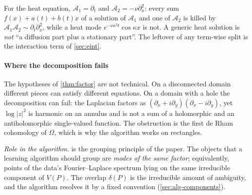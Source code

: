 \documentclass[11pt]{article}
\theoremstyle{plain}
\theoremstyle{definition}
\theoremstyle{remark}
\newcommand{\Var}{V}                        %
\newcommand{\deltaP}{\delta(P)}             %
\newcommand{\abs}[1]{\lvert#1\rvert}
\newcommand{\roleinalg}[1]{\par\noindent\emph{Role in the algorithm.} #1\par}
\begin{document}
For the heat equation, $\mathcal A_1=\partial_t$ and $\mathcal A_2=-\nu\partial_x^2$: every sum $f(x)+a(t)+b(t)x$ of a
solution of $\mathcal A_1$ and one of $\mathcal A_2$ is killed by $\mathcal A_1\mathcal A_2\sim\partial_t\partial_x^2$, while a heat mode
$e^{-\nu\kappa^2t}\cos\kappa x$ is not. A generic heat solution is \emph{not} ``a diffusion part plus a
stationary part''. The leftover of any term-wise split is the interaction term of
\cref{sec:eint}.

\paragraph{Where the decomposition fails}
The hypotheses of \cref{thm:factor} are not technical. On a disconnected domain different pieces
can satisfy different equations. On a domain with a hole the decomposition can fail: the Laplacian
factors as $(\partial_x+i\partial_y)(\partial_x-i\partial_y)$, yet $\log\abs{z}^2$ is harmonic on an annulus
and is not a sum of a holomorphic and an antiholomorphic single-valued function. The obstruction is
the first de Rham cohomology of $\Omega$, which is why the algorithm works on rectangles.

\roleinalg{ is the grouping principle of the paper. The objects that a learning
algorithm should group are \emph{modes of the same factor}; equivalently, points of the data's
Fourier--Laplace spectrum lying on the same irreducible component of $\Var(P)$. The overlap $\deltaP$
is the irreducible amount of ambiguity, and the algorithm resolves it by a fixed convention
(\cref{sec:alg-components}).}



\end{document}
